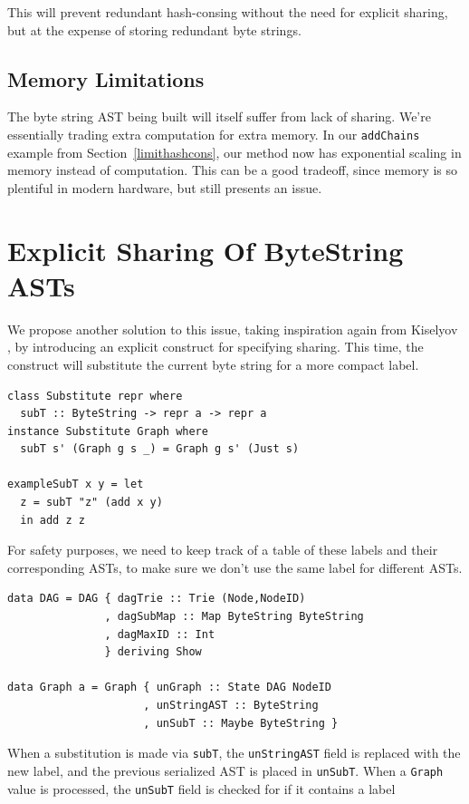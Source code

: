 \documentclass[runningheads]{llncs}
\begin{document}
This will prevent
redundant hash-consing without the need for explicit sharing,
but at the expense of storing redundant byte strings. 

\subsection{Memory Limitations}
The byte string AST being built will itself suffer from lack of sharing. We're
essentially trading extra computation for extra memory. In our 
\texttt{addChains} example from Section~\ref{limithashcons}, our
method now has exponential scaling in memory instead of computation. This can be
a good tradeoff, since memory is so plentiful in modern hardware, but still
presents an issue.

\section{Explicit Sharing Of ByteString ASTs}
We propose another solution to this issue, taking inspiration again from Kiselyov  
\cite{kiselyov:sharing}, by introducing an explicit construct for specifying
sharing. This time, the construct will substitute the current byte string for a
more compact label.

\begin{verbatim}
class Substitute repr where
  subT :: ByteString -> repr a -> repr a
instance Substitute Graph where
  subT s' (Graph g s _) = Graph g s' (Just s)

exampleSubT x y = let
  z = subT "z" (add x y)
  in add z z
\end{verbatim}

For safety purposes, we need to keep track of a table of these labels and their
corresponding ASTs, to make sure we don't use the same label for different ASTs.
\begin{verbatim}
data DAG = DAG { dagTrie :: Trie (Node,NodeID)
               , dagSubMap :: Map ByteString ByteString
               , dagMaxID :: Int
               } deriving Show

data Graph a = Graph { unGraph :: State DAG NodeID
                     , unStringAST :: ByteString
                     , unSubT :: Maybe ByteString }
\end{verbatim}

When a substitution is made via \texttt{subT}, the
\texttt{unStringAST} field is replaced with the new label, and the
previous serialized AST is placed in \texttt{unSubT}. When a
\texttt{Graph} value is processed, the \texttt{unSubT}
field is checked for if it contains a label
\end{document}
